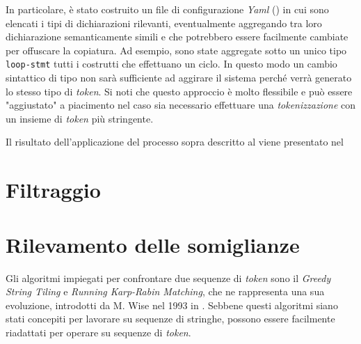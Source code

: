 In particolare, è stato costruito un file di configurazione \textit{Yaml} () in cui sono elencati i tipi di dichiarazioni rilevanti, eventualmente aggregando tra loro dichiarazione semanticamente simili e che potrebbero essere facilmente cambiate per offuscare la copiatura.
%
Ad esempio, sono state aggregate sotto un unico tipo \texttt{loop-stmt} tutti i costrutti che effettuano un ciclo.
%
In questo modo un cambio sintattico di tipo non sarà sufficiente ad aggirare il sistema perché verrà generato lo stesso tipo di \textit{token}.
%
Si noti che questo approccio è molto flessibile e può essere "aggiustato" a piacimento nel caso sia necessario effettuare una \textit{tokenizzazione} con un insieme di \textit{token} più stringente.



Il risultato dell'applicazione del processo sopra descritto al  viene presentato nel 



\section{Filtraggio}

\section{Rilevamento delle somiglianze}
Gli algoritmi impiegati per confrontare due sequenze di \textit{token} sono il \textit{Greedy String Tiling} e \textit{Running Karp-Rabin Matching}, che ne rappresenta una sua evoluzione, introdotti da M. Wise nel 1993 in \cite{wise-running-93}.
%
Sebbene questi algoritmi siano stati concepiti per lavorare su sequenze di stringhe, possono essere facilmente riadattati per operare su sequenze di \textit{token}.




